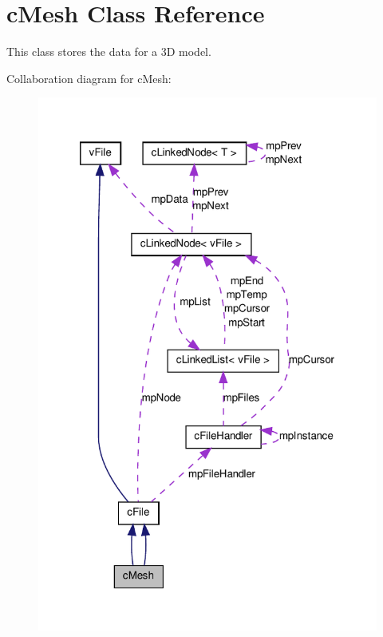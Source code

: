\hypertarget{classc_mesh}{
\section{cMesh Class Reference}
\label{classc_mesh}
}


This class stores the data for a 3D model.  




Collaboration diagram for cMesh:\nopagebreak
\begin{figure}[H]
\begin{center}
\leavevmode
\includegraphics[width=320pt]{classc_mesh__coll__graph}
\end{center}
\end{figure}
